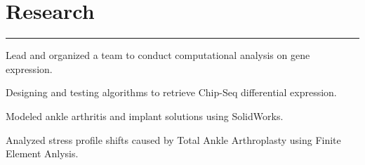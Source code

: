 \documentclass[letterpaper]{deedy-resume} %
\newcommand{\colorrule}[1]{%
\begingroup\color{#1}\hrule\endgroup%
}%
\begin{document}
\sectionspace %
\vspace{1 mm}



\section{Research}

\normalfont
\colorrule{black}
\vspace{2 mm}
\hfill
{}
\hfill
{}
\vspace{1 mm}
\begin{tightitemize}
	\item Lead and organized a team to conduct computational analysis on gene expression.
	\item Designing and testing algorithms to retrieve Chip-Seq differential expression.  	
\end{tightitemize}		
\sectionspace %
\vspace{2 mm}

\hfill
{}
\hfill
{}
\vspace{1 mm}
\begin{tightitemize}
	\item Modeled ankle arthritis and implant solutions using SolidWorks. 
	\item Analyzed stress profile shifts caused by Total Ankle Arthroplasty using Finite Element Anlysis. 
 \end{tightitemize}
\end{document}
